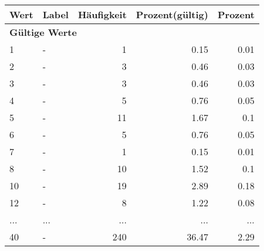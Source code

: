      \begin{longtable}{lXrrr}
     \toprule
     \textbf{Wert} & \textbf{Label} & \textbf{Häufigkeit} & \textbf{Prozent(gültig)} & \textbf{Prozent} \\
     \endhead
     \midrule
     \multicolumn{5}{l}{\textbf{Gültige Werte}}\\
        1 & \multicolumn{1}{X}{-} & %
          \num{1} &
          \num[round-mode=places,round-precision=2]{0.15} &
          \num[round-mode=places,round-precision=2]{0.01} \\
        2 & \multicolumn{1}{X}{-} & %
          \num{3} &
          \num[round-mode=places,round-precision=2]{0.46} &
          \num[round-mode=places,round-precision=2]{0.03} \\
        3 & \multicolumn{1}{X}{-} & %
          \num{3} &
          \num[round-mode=places,round-precision=2]{0.46} &
          \num[round-mode=places,round-precision=2]{0.03} \\
        4 & \multicolumn{1}{X}{-} & %
          \num{5} &
          \num[round-mode=places,round-precision=2]{0.76} &
          \num[round-mode=places,round-precision=2]{0.05} \\
        5 & \multicolumn{1}{X}{-} & %
          \num{11} &
          \num[round-mode=places,round-precision=2]{1.67} &
          \num[round-mode=places,round-precision=2]{0.1} \\
        6 & \multicolumn{1}{X}{-} & %
          \num{5} &
          \num[round-mode=places,round-precision=2]{0.76} &
          \num[round-mode=places,round-precision=2]{0.05} \\
        7 & \multicolumn{1}{X}{-} & %
          \num{1} &
          \num[round-mode=places,round-precision=2]{0.15} &
          \num[round-mode=places,round-precision=2]{0.01} \\
        8 & \multicolumn{1}{X}{-} & %
          \num{10} &
          \num[round-mode=places,round-precision=2]{1.52} &
          \num[round-mode=places,round-precision=2]{0.1} \\
        10 & \multicolumn{1}{X}{-} & %
          \num{19} &
          \num[round-mode=places,round-precision=2]{2.89} &
          \num[round-mode=places,round-precision=2]{0.18} \\
        12 & \multicolumn{1}{X}{-} & %
          \num{8} &
          \num[round-mode=places,round-precision=2]{1.22} &
          \num[round-mode=places,round-precision=2]{0.08} \\
       ... & ... & ... & ... & ... \\
        40 & \multicolumn{1}{X}{-} & %
          \num{240} &
          \num[round-mode=places,round-precision=2]{36.47} &
          \num[round-mode=places,round-precision=2]{2.29} \\


\end{longtable}
